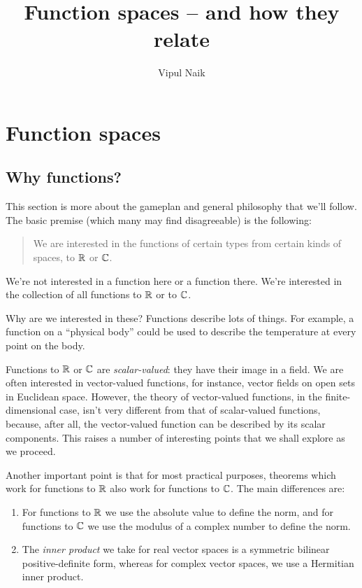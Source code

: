 \documentclass[a4paper]{amsart}
\title{Function spaces -- and how they relate}
\author{Vipul Naik}
\begin{document}
\maketitle

\begin{abstract}

\end{abstract}

\section{Function spaces}

\subsection{Why functions?}

This section is more about the gameplan and general philosophy that
we'll follow. The basic premise (which many may find disagreeable) is
the following:

\begin{quote}
  We are interested in the functions of certain types from certain
  kinds of spaces, to $\mathbb{R}$ or $\mathbb{C}$.
\end{quote}

We're not interested in a function here or a function there. We're
interested in the collection of all functions to $\mathbb{R}$ or to $\mathbb{C}$.

Why are we interested in these? Functions describe lots of things. For
example, a function on a ``physical body'' could be used to describe
the temperature at every point on the body.

Functions to $\mathbb{R}$ or $\mathbb{C}$ are {\em scalar-valued}: they have their
image in a field. We are often interested in vector-valued functions,
for instance, vector fields on open sets in Euclidean space. However,
the theory of vector-valued functions, in the finite-dimensional case,
isn't very different from that of scalar-valued functions, because,
after all, the vector-valued function can be described by its scalar
components. This raises a number of interesting points that we shall
explore as we proceed.

Another important point is that for most practical purposes, theorems
which work for functions to $\mathbb{R}$ also work for functions to $\mathbb{C}$. The
main differences are:

\begin{enumerate}

\item For functions to $\mathbb{R}$ we use the absolute value to define the
  norm, and for functions to $\mathbb{C}$ we use the modulus of a complex
  number to define the norm.

\item The {\em inner product} we take for real vector spaces is a
  symmetric bilinear positive-definite form, whereas for complex
  vector spaces, we use a Hermitian inner product.

\end{enumerate}
\end{document}
